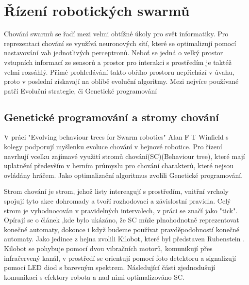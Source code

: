 \section{Řízení robotických swarmů}
Chování swarmů se řadí mezi velmi obtížné úkoly pro svět informatiky. Pro reprezentaci chování se využívá neuronových sítí, které se optimalizují pomocí nastavování vah jednotlivých perceptronů. Neboť se jedná o velký prostor vstupních informací ze sensorů a prostor pro interakci s prostředím je taktéž velmi rozsáhlý. Přímé prohledávání takto obřího prostoru nepřichází v úvahu, proto v poslední získavají na oblibě evoluční algoritmy. Mezi nejvíce používané patří Evoluční strategie, či Genetické programování \par 

\subsection{Genetické programování a stromy chování}
V práci "Evolving behaviour trees for Swarm robotics" \cite{jonesevolving} Alan F T Winfield s kolegy podporují myšlenku evoluce chování v hejnové robotice. Pro řízení navrhují vcelku zajímavé využití stromů chování(SC)(Behaviour tree), které mají uplatnění především v herním průmyslu pro chování charakterů, které nejsou ovládány hráčem. Jako optimalizační algoritmus zvolili Genetické programování. 
\par
Strom chování je strom, jehož listy intereagují s prostředím, vnitřní vrcholy spojují tyto akce dohromady a tvoří rozhodovací a závislostní pravidla. Celý strom je vyhodnocován v pravidelných intervalech, v práci se značí jako "tick". Opírají se o článek \cite{shoulson2011parameterizing},kde bylo ukázáno, že SC může plnohodnotně reprezentovat konečné automaty, dokonce i když budeme používat pravděpodobností konečné automaty. Jako jedince z hejna zvolili Kilobot, které byl představen Rubenstein \cite{Kilobots}. Kilobot se pohybuje pomocí dvou vibračních motorů, komunikují přes infračervený kanál, v prostředí se orientují pomocí foto detektoru a signalizují pomocí LED diod s barevným spektrem. Následující části zjednodušují komunikaci s efektory robota a nad nimi optimalizováno SC. 
\par
